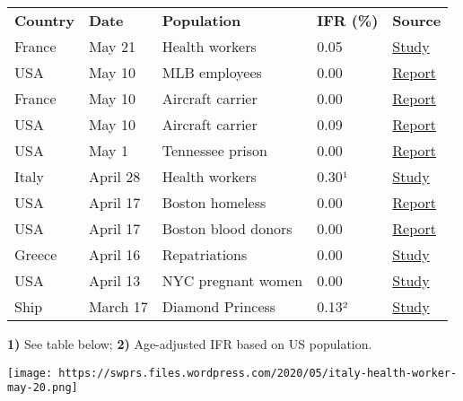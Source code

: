 \begin{longtable}[]{@{}lllll@{}}
\toprule
\endhead
\textbf{Country} & \textbf{Date} & \textbf{Population} & \textbf{IFR
(\%)} & \textbf{Source}\tabularnewline
France & May 21 & Health workers & 0.05 &
\href{https://www.santepubliquefrance.fr/maladies-et-traumatismes/maladies-et-infections-respiratoires/infection-a-coronavirus/documents/bulletin-national/covid-19-point-epidemiologique-du-21-mai-2020}{Study}\tabularnewline
USA & May 10 & MLB employees & 0.00 &
\href{https://www.sfchronicle.com/athletics/article/MLB-antibody-study-7-percent-exposed-to-15260314.php}{Report}\tabularnewline
France & May 10 & Aircraft carrier & 0.00 &
\href{https://en.wikipedia.org/wiki/COVID-19_pandemic_on_Charles_de_Gaulle}{Report}\tabularnewline
USA & May 10 & Aircraft carrier & 0.09 &
\href{https://en.wikipedia.org/wiki/COVID-19_pandemic_on_USS_Theodore_Roosevelt}{Report}\tabularnewline
USA & May 1 & Tennessee prison & 0.00 &
\href{https://www.tennessean.com/story/news/politics/2020/05/01/tennessee-testing-all-inmates-prison-staff-after-multiple-outbreaks/3067388001/}{Report}\tabularnewline
Italy & April 28 & Health workers & 0.30¹ &
\href{https://www.epicentro.iss.it/coronavirus/bollettino/Bollettino-sorveglianza-integrata-COVID-19_28-aprile-2020.pdf\#page=15}{Study}\tabularnewline
USA & April 17 & Boston homeless & 0.00 &
\href{https://www.wsbtv.com/news/trending/coronavirus-cdc-reviewing-stunning-universal-testing-results-boston-homeless-shelter/ZADQ45HCAZEVJAZA3OTCUR7M6M/}{Report}\tabularnewline
USA & April 17 & Boston blood donors & 0.00 &
\href{https://archive.is/20200418222442/https://www.bostonglobe.com/2020/04/17/business/nearly-third-200-blood-samples-taken-chelsea-show-exposure-coronavirus/}{Report}\tabularnewline
Greece & April 16 & Repatriations & 0.00 &
\href{https://academic.oup.com/jtm/advance-article/doi/10.1093/jtm/taaa054/5820895}{Study}\tabularnewline
USA & April 13 & NYC pregnant women & 0.00 &
\href{https://www.nejm.org/doi/full/10.1056/NEJMc2009316}{Study}\tabularnewline
Ship & March 17 & Diamond Princess & 0.13² &
\href{https://www.statnews.com/2020/03/17/a-fiasco-in-the-making-as-the-coronavirus-pandemic-takes-hold-we-are-making-decisions-without-reliable-data/}{Study}\tabularnewline
\bottomrule
\end{longtable}

\textbf{1)} See table below; \textbf{2)} Age-adjusted IFR based on US
population.

\texttt{[image: https://swprs.files.wordpress.com/2020/05/italy-health-worker-may-20.png]}

